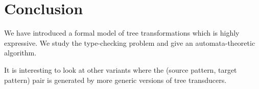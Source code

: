 \section{Conclusion}\label{sec:conclusion-trees}

We have introduced a formal model of tree transformations which is highly expressive. We study the type-checking problem and give an automata-theoretic algorithm.

It is interesting to look at other variants where the (source pattern, target pattern) pair is generated by more generic versions of tree transducers. 